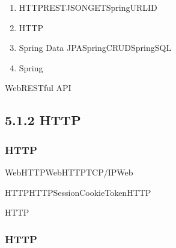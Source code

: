 \important{}

\begin{enumerate}
\def\labelenumi{\arabic{enumi}.}
\item
  HTTPRESTJSONGETSpringURLID
\item
  HTTP
\item
  Spring
  Data JPASpringCRUDSpringSQL
\item
  \important{}Spring
\end{enumerate}

\important{}WebRESTful API\important{}\important{}\important{}

\hypertarget{section-14}{%
\subsubsection{}\label{section-14}}

\important{}

\important{}\important{}\important{}\important{}

\important{}\important{}\important{}\important{}

\important{}\important{}\important{}\important{}\important{}\important{}

\hypertarget{http}{%
\subsection{5.1.2 HTTP}\label{http}}

\hypertarget{http-1}{%
\subsubsection{HTTP}\label{http-1}}

WebHTTP\important{-}WebHTTP\important{}TCP/IPWeb

HTTPHTTPSessionCookieToken\important{}HTTP\important{}

HTTP\important{}\important{}\important{}

\hypertarget{http-2}{%
\subsubsection{HTTP}\label{http-2}}

